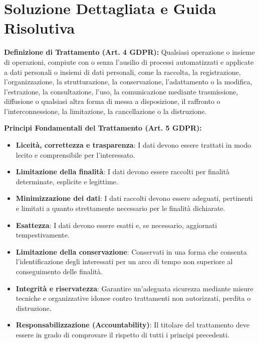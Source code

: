 \documentclass[11pt,a4paper]{article}
\begin{document}
\newpage
\section{Soluzione Dettagliata e Guida Risolutiva}

\begin{solutionbox}
\textbf{Definizione di Trattamento (Art. 4 GDPR):}
Qualsiasi operazione o insieme di operazioni, compiute con o senza l'ausilio di processi automatizzati e applicate a dati personali o insiemi di dati personali, come la raccolta, la registrazione, l'organizzazione, la strutturazione, la conservazione, l'adattamento o la modifica, l'estrazione, la consultazione, l'uso, la comunicazione mediante trasmissione, diffusione o qualsiasi altra forma di messa a disposizione, il raffronto o l'interconnessione, la limitazione, la cancellazione o la distruzione.

\textbf{Principi Fondamentali del Trattamento (Art. 5 GDPR):}
\begin{itemize}
    \item \textbf{Liceit\`a, correttezza e trasparenza}: I dati devono essere trattati in modo lecito e comprensibile per l'interessato.
    \item \textbf{Limitazione della finalit\`a}: I dati devono essere raccolti per finalit\`a determinate, esplicite e legittime.
    \item \textbf{Minimizzazione dei dati}: I dati raccolti devono essere adeguati, pertinenti e limitati a quanto strettamente necessario per le finalit\`a dichiarate.
    \item \textbf{Esattezza}: I dati devono essere esatti e, se necessario, aggiornati tempestivamente.
    \item \textbf{Limitazione della conservazione}: Conservati in una forma che consenta l'identificazione degli interessati per un arco di tempo non superiore al conseguimento delle finalit\`a.
    \item \textbf{Integrit\`a e riservatezza}: Garantire un'adeguata sicurezza mediante misure tecniche e organizzative idonee contro trattamenti non autorizzati, perdita o distruzione.
    \item \textbf{Responsabilizzazione (Accountability)}: Il titolare del trattamento deve essere in grado di comprovare il rispetto di tutti i principi precedenti.
\end{itemize}


\end{solutionbox}
\end{document}
